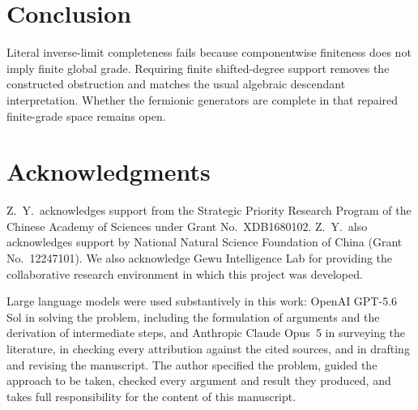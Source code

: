 \documentclass[11pt,reqno]{amsart}
\theoremstyle{plain}
\theoremstyle{definition}
\theoremstyle{remark}
\numberwithin{equation}{section}
\begin{document}
\section{Conclusion}

Literal inverse-limit completeness fails because componentwise finiteness
does not imply finite global grade.  Requiring finite shifted-degree support
removes the constructed obstruction and matches the usual algebraic
descendant interpretation.  Whether the fermionic generators are complete
in that repaired finite-grade space remains open.

\section*{Acknowledgments}

Z.\ Y.\ acknowledges support from the Strategic Priority Research Program of the
Chinese Academy of Sciences under Grant No.~XDB1680102. Z.\ Y.\ also
acknowledges support by National Natural Science Foundation of China (Grant
No.~12247101). We also acknowledge Gewu Intelligence Lab for providing the
collaborative research environment in which this project was developed.

Large language models were used substantively in this work: OpenAI GPT-5.6 Sol
in solving the problem, including the formulation of arguments and the
derivation of intermediate steps, and Anthropic Claude Opus~5 in surveying the
literature, in checking every attribution against the cited sources, and in
drafting and revising the manuscript. The author specified the problem, guided
the approach to be taken, checked every argument and result they produced, and
takes full responsibility for the content of this manuscript.



\end{document}
